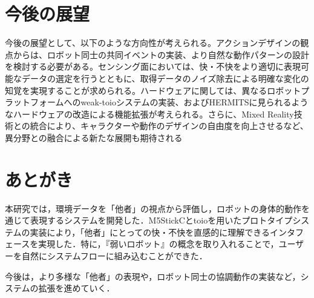 \documentclass[paper=a4paper,jafontsize=9pt,head_space=15mm,gutter=20mm,
twocolumn,number_of_lines=49, line_length=26zw]{myuarticle}
\begin{document}
\section{今後の展望}
今後の展望として、以下のような方向性が考えられる。アクションデザインの観点からは、ロボット同士の共同イベントの実装、より自然な動作パターンの設計を検討する必要がある。センシング面においては、快・不快をより適切に表現可能なデータの選定を行うとともに、取得データのノイズ除去による明確な変化の知覚を実現することが求められる。ハードウェアに関しては、異なるロボットプラットフォームへのweak-toioシステムの実装、およびHERMITSに見られるようなハードウェアの改造による機能拡張が考えられる。さらに、Mixed
Reality技術との統合により、キャラクターや動作のデザインの自由度を向上させるなど、異分野との融合による新たな展開も期待される

\section{あとがき}
本研究では，環境データを「他者」の視点から評価し，ロボットの身体的動作を通じて表現するシステムを開発した．M5StickCとtoioを用いたプロトタイプシステムの実装により，「他者」にとっての快・不快を直感的に理解できるインタフェースを実現した．特に，『弱いロボット』の概念を取り入れることで，ユーザーを自然にシステムフローに組み込むことができた．

今後は，より多様な「他者」の表現や，ロボット同士の協調動作の実装など，システムの拡張を進めていく．

\renewcommand{\refname}{　参考文献}


\end{document}
